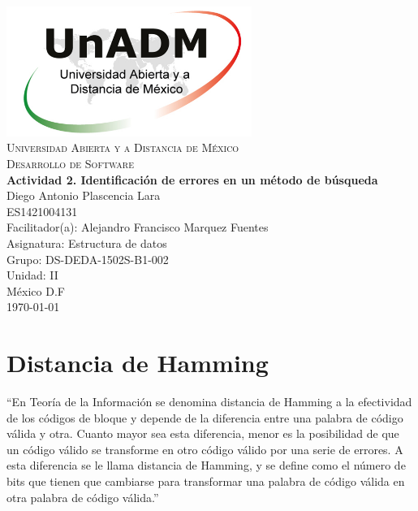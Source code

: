 \documentclass[spanish,12pt,letterpapper]{article}
\begin{document}
	\begin{titlepage}
		\begin{center}
			\includegraphics[width=0.6\textwidth]{./logoUnADM}~\\[1cm] 
			\textsc{Universidad Abierta y a Distancia de M\'exico}\\[0.8cm]
			\textsc{Desarrollo de Software}\\[1.8cm]
			
			\textbf{ \Large Actividad 2. Identificación de errores en un método de búsqueda }\\[3cm]
			
			Diego Antonio Plascencia Lara\\ ES1421004131 \\[0.4cm]
			Facilitador(a): Alejandro Francisco Marquez Fuentes\\
			Asignatura: Estructura de datos\\
			Grupo: DS-DEDA-1502S-B1-002 \\
			Unidad: II \\
			
			\vfill M\'exico D.F\\{\today}
			
		\end{center}
	\end{titlepage}
	
	\section{Distancia de Hamming \\}
	
	``En Teoría de la Información se denomina distancia de Hamming a la efectividad de los códigos de bloque y depende de la diferencia entre una palabra de código válida y otra. Cuanto mayor sea esta diferencia, menor es la posibilidad de que un código válido se transforme en otro código válido por una serie de errores. A esta diferencia se le llama distancia de Hamming, y se define como el número de bits que tienen que cambiarse para transformar una palabra de código válida en otra palabra de código válida.''\\
	
\end{document}
